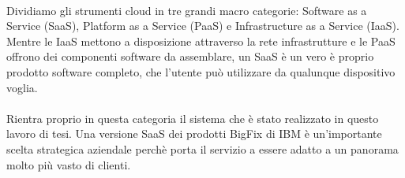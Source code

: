 \paragraph{}
Dividiamo gli strumenti cloud in tre grandi macro categorie: Software as a Service (SaaS), Platform as a Service (PaaS) e Infrastructure as a Service (IaaS). Mentre le IaaS mettono a disposizione attraverso la rete infrastrutture e le PaaS offrono dei componenti software da assemblare, un SaaS è un vero è proprio prodotto software completo, che l'utente può utilizzare da qualunque dispositivo voglia.
\paragraph{}
Rientra proprio in questa categoria il sistema che è stato realizzato in questo lavoro di tesi. Una versione SaaS dei prodotti BigFix di IBM è un'importante scelta strategica aziendale perchè porta il servizio a essere adatto a un panorama molto più vasto di clienti.
